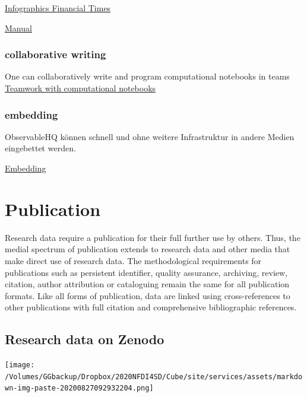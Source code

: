 \documentclass[
  english,
  paper=a4,
  oneside,captions=tableheading
]{scrbook}
\begin{document}
\href{https://www.ft.com/graphics}{Infographics Financial Times}

\href{https://observablehq.com/@observablehq/user-manual}{Manual}

\hypertarget{collaborative-writing}{%
\subsubsection{collaborative writing}\label{collaborative-writing}}

One can collaboratively write and program computational notebooks in
teams
\href{https://observablehq.com/@observablehq/fork-share-merge?collection=@observablehq/introduction}{Teamwork
with computational notebooks}

\hypertarget{embedding}{%
\subsubsection{embedding}\label{embedding}}

ObservableHQ können schnell und ohne weitere Infrastruktur in andere
Medien eingebettet werden.

\href{https://observablehq.com/@mbostock/embedded-notebook}{Embedding}

\hypertarget{publication}{%
\section{Publication}\label{publication}}

Research data require a publication for their full further use by
others. Thus, the medial spectrum of publication extends to research
data and other media that make direct use of research data. The
methodological requirements for publications such as persistent
identifier, quality assurance, archiving, review, citation, author
attribution or cataloguing remain the same for all publication formats.
Like all forms of publication, data are linked using cross-references to
other publications with full citation and comprehensive bibliographic
references.

\hypertarget{research-data-on-zenodo}{%
\subsection{Research data on Zenodo}\label{research-data-on-zenodo}}

\texttt{[image: /Volumes/GGbackup/Dropbox/2020NFDI4SD/Cube/site/services/assets/markdown-img-paste-20200827092932204.png]}
\end{document}
